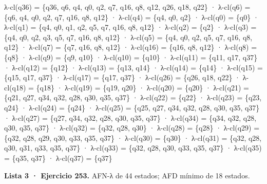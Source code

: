 λ-cl(q36) = \{q36, q6, q4, q0, q2, q7, q16, q8, q12, q26, q18, q22\} · λ-cl(q6) = \{q6, q4, q0, q2, q7, q16, q8, q12\} · λ-cl(q4) = \{q4, q0, q2\} · λ-cl(q0) = \{q0\} · λ-cl(q1) = \{q4, q0, q1, q2, q5, q7, q16, q8, q12\} · λ-cl(q2) = \{q2\} · λ-cl(q3) = \{q4, q0, q2, q3, q5, q7, q16, q8, q12\} · λ-cl(q5) = \{q4, q0, q2, q5, q7, q16, q8, q12\} · λ-cl(q7) = \{q7, q16, q8, q12\} · λ-cl(q16) = \{q16, q8, q12\} · λ-cl(q8) = \{q8\} · λ-cl(q9) = \{q9, q10\} · λ-cl(q10) = \{q10\} · λ-cl(q11) = \{q11, q17, q37\} · λ-cl(q12) = \{q12\} · λ-cl(q13) = \{q13, q14\} · λ-cl(q14) = \{q14\} · λ-cl(q15) = \{q15, q17, q37\} · λ-cl(q17) = \{q17, q37\} · λ-cl(q26) = \{q26, q18, q22\} · λ-cl(q18) = \{q18\} · λ-cl(q19) = \{q19, q20\} · λ-cl(q20) = \{q20\} · λ-cl(q21) = \{q21, q27, q34, q32, q28, q30, q35, q37\} · λ-cl(q22) = \{q22\} · λ-cl(q23) = \{q23, q24\} · λ-cl(q24) = \{q24\} · λ-cl(q25) = \{q25, q27, q34, q32, q28, q30, q35, q37\} · λ-cl(q27) = \{q27, q34, q32, q28, q30, q35, q37\} · λ-cl(q34) = \{q34, q32, q28, q30, q35, q37\} · λ-cl(q32) = \{q32, q28, q30\} · λ-cl(q28) = \{q28\} · λ-cl(q29) = \{q32, q28, q29, q30, q33, q35, q37\} · λ-cl(q30) = \{q30\} · λ-cl(q31) = \{q32, q28, q30, q31, q33, q35, q37\} · λ-cl(q33) = \{q32, q28, q30, q33, q35, q37\} · λ-cl(q35) = \{q35, q37\} · λ-cl(q37) = \{q37\}

\textbf{Lista 3 · Ejercicio 253.} AFN-λ de 44 estados; AFD mínimo de 18 estados.

